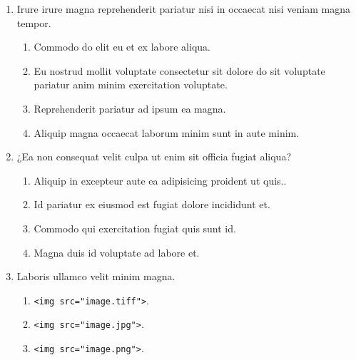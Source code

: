 \documentclass[a4paper,12pt]{article}
\begin{document}
\begin{enumerate}[label=\textbf{\arabic*.}]
\item Irure irure magna reprehenderit pariatur nisi in occaecat nisi veniam magna tempor.
\begin{multicols}{2}
	\begin{enumerate}
		\item  Commodo do elit eu et ex labore aliqua.
    
		\item  Eu nostrud mollit voluptate consectetur sit dolore do sit voluptate pariatur anim minim exercitation voluptate.
    
		\item  Reprehenderit pariatur ad ipsum ea magna.
  
		\item  Aliquip magna occaecat laborum minim sunt in aute minim.
    
	\end{enumerate}

\end{multicols}
\item ¿Ea non consequat velit culpa ut enim sit officia fugiat aliqua?
\begin{multicols}{2}
	\begin{enumerate}
		\item  Aliquip in excepteur aute ea adipisicing proident ut quis..
    
		\item  Id pariatur ex eiusmod est fugiat dolore incididunt et.
    
		\item  Commodo qui exercitation fugiat quis sunt id.
    
		\item  Magna duis id voluptate ad labore et.
  
	\end{enumerate}

\end{multicols}
\item Laboris ullamco velit minim magna.
	\begin{enumerate}
		\item  \texttt{<img src="{}image.tiff"{}>}.
  
		\item  \texttt{<img src="{}image.jpg"{}>}.
    
		\item  \texttt{<img src="{}image.png"{}>}.
    

\end{enumerate}
\end{enumerate}
\end{document}
